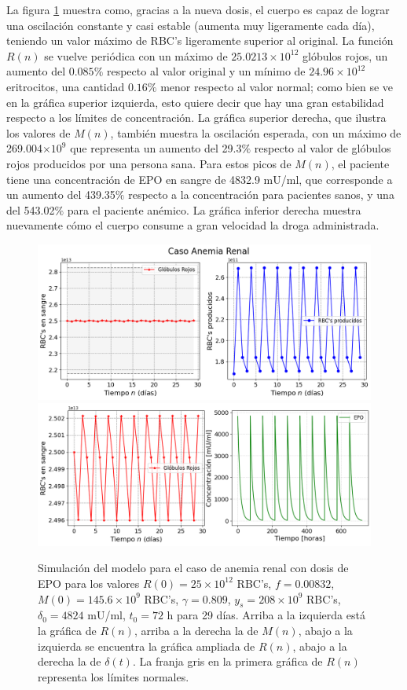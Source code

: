 La figura \ref{sec:variaciones:fig:Anemia2} muestra como, gracias a la nueva dosis, el cuerpo es capaz de lograr una oscilación constante y casi estable (aumenta muy ligeramente cada día), teniendo un valor máximo de RBC's ligeramente superior al original. La función $R(n)$ se vuelve periódica con un máximo de $25.0213\times 10^{12}$ glóbulos rojos, un aumento del $0.085\%$ respecto al valor original y un mínimo de $24.96\times 10^{12}$ eritrocitos, una cantidad $0.16\%$ menor respecto al valor normal; como bien se ve en la gráfica superior izquierda, esto quiere decir que hay una gran estabilidad respecto a los límites de concentración. La gráfica superior derecha, que ilustra los valores de $M(n)$, también muestra la oscilación esperada, con un máximo de 269.004$\times 10^{9}$ que representa un aumento del 29.3$\%$ respecto al valor de glóbulos rojos producidos por una persona sana. Para estos picos de $M(n)$, el paciente tiene una concentración de EPO en sangre de 4832.9 mU/ml, que corresponde a un aumento del 439.35$\%$ respecto a la concentración para pacientes sanos, y una del 543.02$\%$ para el paciente anémico. La gráfica inferior derecha muestra nuevamente cómo el cuerpo consume a gran velocidad la droga administrada. 

\begin{figure}[H]
    \centering
    \captionsetup{justification=centering}
    \includegraphics[scale=0.526]{figures/AR21.png}
    \includegraphics[scale=0.526]{figures/AR22.png}
    \caption{Simulación del modelo para el caso de anemia renal con dosis de EPO para los valores $R(0)=25\times 10^{12}$ RBC's, $f=0.00832$, $M(0)=145.6\times 10^{9}$ RBC's, $\gamma = 0.809$, $y_s = 208\times10^{9}$ RBC's, $\delta_0 = 4824$ mU/ml, $t_0 =72$ h para 29 días. Arriba a la izquierda está la gráfica de $R(n)$, arriba a la derecha la de $M(n)$, abajo a la izquierda se encuentra la gráfica ampliada de $R(n)$, abajo a la derecha la de $\delta(t)$. La franja gris en la primera gráfica de $R(n)$ representa los límites normales.}
    \label{sec:variaciones:fig:Anemia2}
\end{figure}

